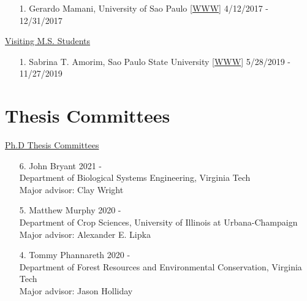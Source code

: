 \documentclass[margin,line,10pt]{res}
\begin{document}
\begin{resume}
\begin{enumerate}
\vspace{0.3cm}

\item [1.] Gerardo Mamani, University of Sao Paulo  [\textcolor{blue}{\href{https://github.com/gerardocorn}{WWW}}]  \hfill 4/12/2017 - 12/31/2017
\end{enumerate}



\begin{flushleft}
\hspace{0.2cm} \underline{Visiting M.S. Students}
\end{flushleft}
\begin{enumerate}
\item [1.] Sabrina T. Amorim, Sao Paulo State University [\textcolor{blue}{\href{https://sabrinaam.github.io/}{WWW}}]  \hfill 5/28/2019 - 11/27/2019
\end{enumerate}


\vspace{0.5cm}
\section{\sc Thesis Committees}

\begin{flushleft}
\hspace{0.2cm} \underline{Ph.D Thesis Committees}
\end{flushleft}
\begin{enumerate}

 \item [6.] John Bryant \hfill 2021 - \\
  Department of Biological Systems Engineering, Virginia Tech \\
  Major advisor: Clay Wright

  \vspace{0.3cm}

  \item [5.] Matthew Murphy \hfill 2020 - \\
  Department of Crop Sciences, University of Illinois at Urbana-Champaign \\
  Major advisor: Alexander E. Lipka 

  \vspace{0.3cm}
  
  \item [4.] Tommy Phannareth \hfill 2020 - \\
  Department of Forest Resources and Environmental Conservation, Virginia Tech \\
  Major advisor: Jason Holliday


\end{enumerate}
\end{resume}
\end{document}
